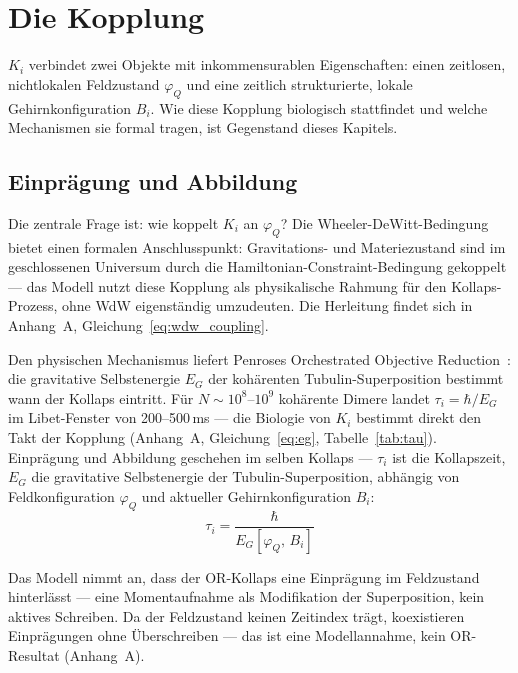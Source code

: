 \documentclass[11pt,a4paper]{article}
\begin{document}
\section{Die Kopplung}
\label{sec:kopplung}

$K_i$ verbindet zwei Objekte mit inkommensurablen Eigenschaften: einen
zeitlosen, nichtlokalen Feldzustand $\varphi_Q$ und eine zeitlich strukturierte,
lokale Gehirnkonfiguration $B_i$. Wie diese Kopplung biologisch stattfindet und
welche Mechanismen sie formal tragen, ist Gegenstand dieses Kapitels.

\subsection*{Einprägung und Abbildung}

Die zentrale Frage ist: wie koppelt $K_i$ an $\varphi_Q$? Die Wheeler-DeWitt-Bedingung
bietet einen formalen Anschlusspunkt: Gravitations- und Materiezustand sind im
geschlossenen Universum durch die Hamiltonian-Constraint-Bedingung gekoppelt —
das Modell nutzt diese Kopplung als physikalische Rahmung für den Kollaps-Prozess,
ohne WdW eigenständig umzudeuten. Die Herleitung findet sich in Anhang~A,
Gleichung~\eqref{eq:wdw_coupling}.

Den physischen Mechanismus liefert Penroses Orchestrated Objective
Reduction~\citep{penrose1994,hameroff2014}: die gravitative Selbstenergie $E_G$
der kohärenten Tubulin-Superposition bestimmt wann der Kollaps eintritt.
Für $N \sim 10^8$–$10^9$ kohärente Dimere landet $\tau_i = \hbar/E_G$
im Libet-Fenster von 200–500\,ms — die Biologie von $K_i$ bestimmt direkt
den Takt der Kopplung (Anhang~A, Gleichung~\eqref{eq:eg},
Tabelle~\ref{tab:tau}). Einprägung und Abbildung geschehen im selben Kollaps — $\tau_i$ ist die
Kollapszeit, $E_G$ die gravitative Selbstenergie der Tubulin-Superposition,
abhängig von Feldkonfiguration $\varphi_Q$ und aktueller Gehirnkonfiguration $B_i$:
\begin{equation}
  \tau_i = \frac{\hbar}{E_G[\varphi_Q,\, B_i]}
  \label{eq:kopplungstakt}
\end{equation}

Das Modell nimmt an, dass der OR-Kollaps eine Einprägung im Feldzustand
hinterlässt — eine Momentaufnahme als Modifikation der Superposition, kein
aktives Schreiben. Da der Feldzustand keinen Zeitindex trägt, koexistieren
Einprägungen ohne Überschreiben — das ist eine Modellannahme, kein
OR-Resultat (Anhang~A).
\end{document}
